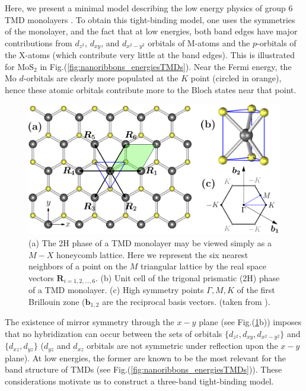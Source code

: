 Here, we present a minimal model describing the low energy physics of group 6 TMD monolayers \cite{liu_three-band_2013}.
To obtain this tight-binding model, one uses the symmetries of the monolayer, and the fact that at low energies, both band edges have major contributions from $d_{z^2}$, $d_{xy}$, and $d_{x^2 - y^2}$ orbitals of M-atoms and the $p$-orbitals of the X-atoms (which contribute very little at the band edges).
This is illustrated for $\text{Mo}\text{S}_2$ in Fig.(\ref{fig:nanoribbons_energiesTMDs}).
Near the Fermi energy, the $\text{Mo}$ $d$-orbitals are clearly more populated at the $K$ point (circled in orange), hence these atomic orbitals contribute more to the Bloch states near that point.
\begin{figure}[H]
\centering
\includegraphics[scale = 0.2]{images/tmd2.png}
 \caption{(a) The 2H phase of a  TMD monolayer may be viewed simply as a $M-X$ honeycomb lattice. Here we represent the six nearest neighbors of a point on the $M$ triangular lattice by the real space vectors $\bm R_{i = 1,2,..., 6}$.
(b) Unit cell of the trigonal prismatic (2H) phase of a TMD monolayer.
(c) High symmetry points $\Gamma, M, K$ of the first Brillouin zone ($\bm b_{1,2}$ are the reciprocal basis vectors.\label{fig:tmdHex} (taken from \cite{liu_three-band_2013}). }
\end{figure}
The existence of mirror symmetry through the $x-y$ plane (see Fig.(\ref{fig:tmdHex}b)) imposes that no hybridization can occur between the sets of orbitals $\{d_{z^2}, d_{xy}, d_{x^2 - y^2} \}$ and $\{d_{xz}, d_{yz} \}$ ($d_{yz}$ and $d_{xz}$ orbitals are not symmetric under reflection upon the $x-y$ plane).
At low energies, the former are known to be the most relevant for the band structure of TMDs (see Fig.(\ref{fig:nanoribbons_energiesTMDs})).
These considerations motivate us to construct a three-band tight-binding model.
